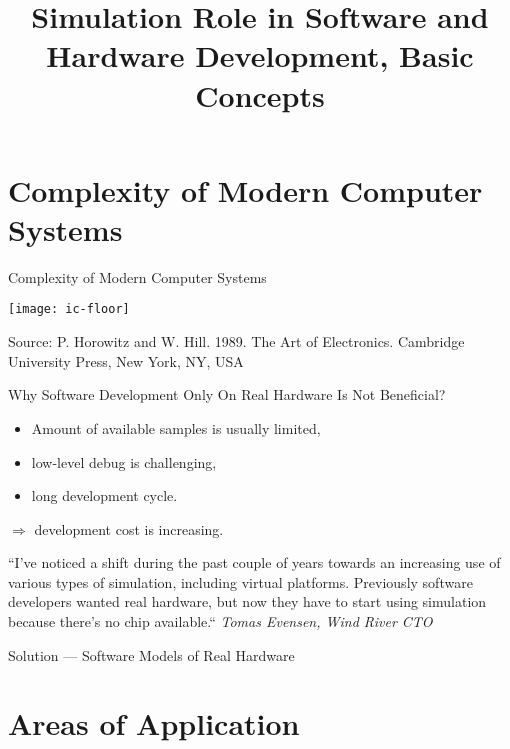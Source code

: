 

\title{Simulation Role in Software and Hardware Development, Basic Concepts}



\startslides

\section{Complexity of Modern Computer Systems}

\begin{frame}{Complexity of Modern Computer Systems}

\centering
\texttt{[image: ic-floor]}

\tiny{Source: P. Horowitz and W. Hill. 1989. The Art of Electronics. Cambridge
University Press, New York, NY, USA}

\end{frame}

\begin{frame}{Why Software Development Only On Real Hardware Is Not Beneficial?}

\begin{itemize}
\item Amount of available samples is usually limited,
\item low-level debug is challenging,
\item long development cycle.
\end{itemize}

$\Rightarrow$ development cost is increasing.

\bigskip

``\tiny{I've noticed a shift during the past couple of years towards an increasing
use of various types of simulation, including virtual platforms. Previously
software developers wanted real hardware, but now they have to start using
simulation because there's no chip available.``
\textit{Tomas Evensen, Wind River CTO}}

\end{frame}

\begin{frame}{Solution --- Software Models of Real Hardware}
\centering 
{}

\end{frame}

\section{Areas of Application}

